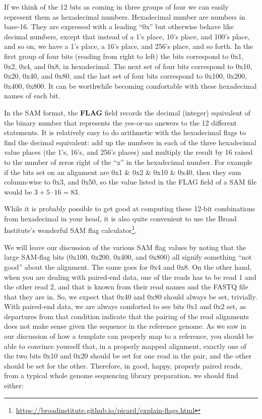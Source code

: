 \documentclass[]{krantz}
\renewcommand{\href}[2]{#2\footnote{\url{#1}}}
\begin{document}
If we think of the 12 bits as coming in three groups of four we can easily represent them as hexadecimal
numbers. Hexadecimal number are numbers in base-16. They are expressed with a leading ``0x'' but otherwise behave
like decimal numbers, except that instead of a 1's place, 10's place, and 100's place, and so on, we have
a 1's place, a 16's place, and 256's place, and so forth.
In the first group of four bits (reading from right to left) the bits correspond to
0x1, 0x2, 0x4, and 0x8, in hexadecimal. The next set of four bits correspond to 0x10, 0x20, 0x40, and 0x80,
and the last set of four bits correspond to 0x100, 0x200, 0x400, 0x800. It can be worthwhile becoming comfortable with
these hexadecimal names of each bit.

In the SAM format,
the \textbf{FLAG} field records the decimal (integer) equivalent of the binary number that represents
the yes-or-no answers to the 12 different statements. It is relatively easy to do arithmetic with
the hexadecimal flags to
find the decimal equivalent: add up the numbers in each of the three hexadecimal value places
(the 1's, 16's, and 256's places)
and multiply the result by 16 raised to the number of zeros right of the ``x'' in the hexadecimal number. For example if the
bits set on an alignment are 0x1 \& 0x2 \& 0x10 \& 0x40, then they sum column-wise to 0x3, and 0x50, so the
value listed in the FLAG field of a SAM file would be \(3 + 5 \cdot 16 = 83\).

While it is probably possible to get good at computing these 12-bit combinations
from hexadecimal in your
head, it is also quite convenient to use the Broad Institute's wonderful
\href{https://broadinstitute.github.io/picard/explain-flags.html}{SAM flag calculator}.

We will leave our discussion of the various SAM flag values by noting that the large SAM-flag bits
(0x100, 0x200, 0x400, and 0x800) all signify something ``not good'' about the alignment.
The same goes for 0x4 and 0x8. On the other hand, when you are dealing with paired-end
data, one of the reads has to be read 1 and the other read 2, and that is known from their
read names and the FASTQ file that they are in. So, we expect that 0x40 and 0x80 should always be set,
trivially. With paired-end data, we are always comforted to see bits 0x1 and 0x2 set, as departures from
that condition indicate that the pairing of the read alignments does not make sense given the
sequence in the reference genome. As
we saw in our discussion of how a template can properly map to a reference, you should be able to convince
yourself that, in a properly mapped alignment, exactly one of the two bits 0x10 and 0x20 should be set for
one read in the pair, and the other should be set for the other.
Therefore, in good, happy, properly paired reads, from a typical whole genome sequencing library
preparation, we should find either:
\end{document}
